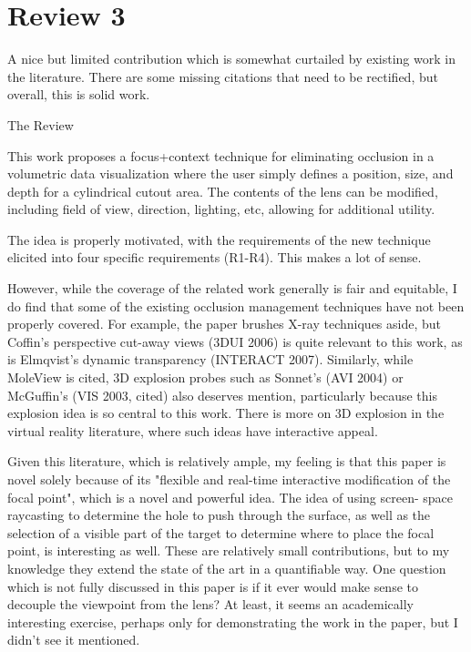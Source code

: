 \documentclass[a4paper,10pt]{article}
\begin{document}
    

\section{Review 3}

A nice but limited contribution which is somewhat curtailed by existing work in
    the literature. There are some missing citations that need to be rectified, but
    overall, this is solid work.

  The Review

    This work proposes a focus+context technique for eliminating occlusion in a
    volumetric data visualization where the user simply defines a position, size, and
    depth for a cylindrical cutout area. The contents of the lens can be modified,
    including field of view, direction, lighting, etc, allowing for additional
    utility.

    The idea is properly motivated, with the requirements of the new technique
    elicited into four specific requirements (R1-R4). This makes a lot of sense.

    However, while the coverage of the related work generally is fair and equitable, I
    do find that some of the existing occlusion management techniques have not been
    properly covered. For example, the paper brushes X-ray techniques aside, but
    Coffin's perspective cut-away views (3DUI 2006) is quite relevant to this work, as
    is Elmqvist's dynamic transparency (INTERACT 2007). Similarly, while MoleView is
    cited, 3D explosion probes such as Sonnet's (AVI 2004) or McGuffin's (VIS 2003,
    cited) also deserves mention, particularly because this explosion idea is so
    central to this work. There is more on 3D explosion in the virtual reality
    literature, where such ideas have interactive appeal.

    Given this literature, which is relatively ample, my feeling is that this paper is
    novel solely because of its "flexible and real-time interactive modification of
    the focal point", which is a novel and powerful idea. The idea of using screen-
    space raycasting to determine the hole to push through the surface, as well as the
    selection of a visible part of the target to determine where to place the focal
    point, is interesting as well. These are relatively small contributions, but to my
    knowledge they extend the state of the art in a quantifiable way. One question
    which is not fully discussed in this paper is if it ever would make sense to
    decouple the viewpoint from the lens? At least, it seems an academically
    interesting exercise, perhaps only for demonstrating the work in the paper, but I
    didn't see it mentioned.
\end{document}
